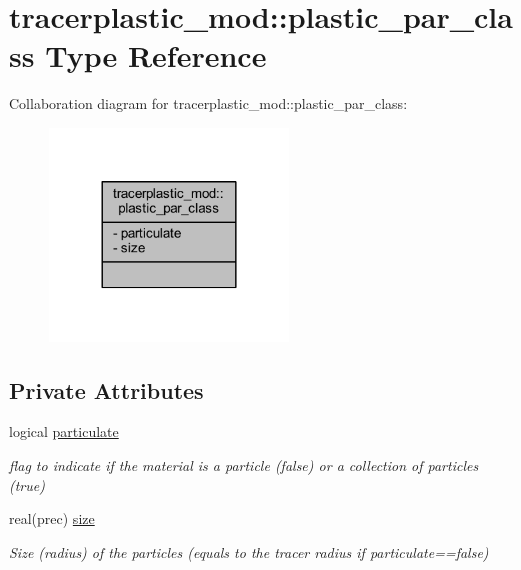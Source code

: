 \hypertarget{structtracerplastic__mod_1_1plastic__par__class}{}\section{tracerplastic\+\_\+mod\+:\+:plastic\+\_\+par\+\_\+class Type Reference}
\label{structtracerplastic__mod_1_1plastic__par__class}


Collaboration diagram for tracerplastic\+\_\+mod\+:\+:plastic\+\_\+par\+\_\+class\+:\nopagebreak
\begin{figure}[H]
\begin{center}
\leavevmode
\includegraphics[width=180pt]{structtracerplastic__mod_1_1plastic__par__class__coll__graph}
\end{center}
\end{figure}
\subsection*{Private Attributes}
\begin{DoxyCompactItemize}
\item 
logical \mbox{\hyperlink{structtracerplastic__mod_1_1plastic__par__class_a013591d7351786219189b294fae263b9}{particulate}}
\begin{DoxyCompactList}\small\item\em flag to indicate if the material is a particle (false) or a collection of particles (true) \end{DoxyCompactList}\item 
real(prec) \mbox{\hyperlink{structtracerplastic__mod_1_1plastic__par__class_a0dd25951e4670cedda088f8a6833ad1b}{size}}
\begin{DoxyCompactList}\small\item\em Size (radius) of the particles (equals to the tracer radius if particulate==false) \end{DoxyCompactList}\end{DoxyCompactItemize}


